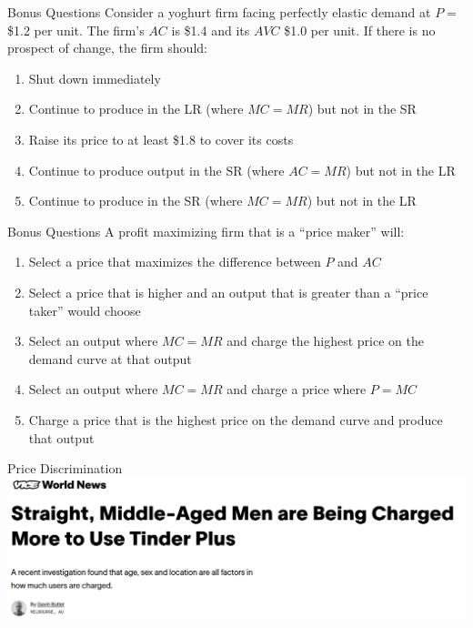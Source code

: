 \documentclass{beamer}
\begin{document}
\begin{frame}{Bonus Questions}
Consider a yoghurt firm facing perfectly elastic demand at $P = $ \$1.2 per unit. The firm's $AC$ is \$1.4 and its $AVC$ \$1.0 per unit. If there is no prospect of change, the firm should:

\begin{enumerate}[label=\alph*)]
\item Shut down immediately
\item Continue to produce in the LR (where $MC = MR$) but not in the SR
\item Raise its price to at least \$1.8 to cover its costs
\item Continue to produce output in the SR (where $AC = MR$) but not in the LR
\item Continue to produce in the SR (where $MC = MR$) but not in the LR
\end{enumerate}
\end{frame}

\begin{frame}{Bonus Questions}
A profit maximizing firm that is a ``price maker'' will:
\begin{enumerate}[label=\alph*)]
\item Select a price that maximizes the difference between $P$ and $AC$
\item Select a price that is higher and an output that is greater than a ``price taker'' would choose
\item Select an output where $MC=MR$ and charge the highest price on the demand curve at that output
\item Select an output where $MC = MR$ and charge a price where $P = MC$
\item Charge a price that is the highest price on the demand curve and produce that output
\end{enumerate}

\end{frame}

\begin{frame}{Price Discrimination}
\includegraphics[width = \textwidth]{images/tinder.png}
\end{frame}
\end{document}
